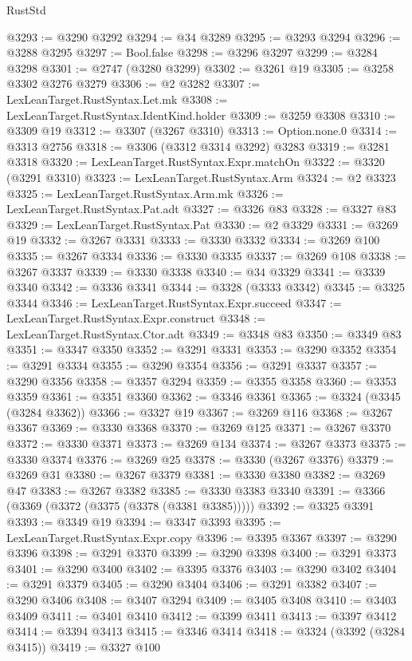 \begin{lexlean}{RustStd}
\begin{coremodule}
@3293 := @3290 @3292
@3294 := @34 @3289
@3295 := @3293 @3294
@3296 := @3288 @3295
@3297 := Bool.false
@3298 := @3296 @3297
@3299 := @3284 @3298
@3301 := @2747 (@3280 @3299)
@3302 := @3261 @19
@3305 := @3258 @3302 @3276 @3279
@3306 := @2 @3282
@3307 := LexLeanTarget.RustSyntax.Let.mk
@3308 := LexLeanTarget.RustSyntax.IdentKind.holder
@3309 := @3259 @3308
@3310 := @3309 @19
@3312 := @3307 (@3267 @3310)
@3313 := Option.none.{0}
@3314 := @3313 @2756
@3318 := @3306 (@3312 @3314 @3292) @3283
@3319 := @3281 @3318
@3320 := LexLeanTarget.RustSyntax.Expr.matchOn
@3322 := @3320 (@3291 @3310)
@3323 := LexLeanTarget.RustSyntax.Arm
@3324 := @2 @3323
@3325 := LexLeanTarget.RustSyntax.Arm.mk
@3326 := LexLeanTarget.RustSyntax.Pat.adt
@3327 := @3326 @83
@3328 := @3327 @83
@3329 := LexLeanTarget.RustSyntax.Pat
@3330 := @2 @3329
@3331 := @3269 @19
@3332 := @3267 @3331
@3333 := @3330 @3332
@3334 := @3269 @100
@3335 := @3267 @3334
@3336 := @3330 @3335
@3337 := @3269 @108
@3338 := @3267 @3337
@3339 := @3330 @3338
@3340 := @34 @3329
@3341 := @3339 @3340
@3342 := @3336 @3341
@3344 := @3328 (@3333 @3342)
@3345 := @3325 @3344
@3346 := LexLeanTarget.RustSyntax.Expr.succeed
@3347 := LexLeanTarget.RustSyntax.Expr.construct
@3348 := LexLeanTarget.RustSyntax.Ctor.adt
@3349 := @3348 @83
@3350 := @3349 @83
@3351 := @3347 @3350
@3352 := @3291 @3331
@3353 := @3290 @3352
@3354 := @3291 @3334
@3355 := @3290 @3354
@3356 := @3291 @3337
@3357 := @3290 @3356
@3358 := @3357 @3294
@3359 := @3355 @3358
@3360 := @3353 @3359
@3361 := @3351 @3360
@3362 := @3346 @3361
@3365 := @3324 (@3345 (@3284 @3362))
@3366 := @3327 @19
@3367 := @3269 @116
@3368 := @3267 @3367
@3369 := @3330 @3368
@3370 := @3269 @125
@3371 := @3267 @3370
@3372 := @3330 @3371
@3373 := @3269 @134
@3374 := @3267 @3373
@3375 := @3330 @3374
@3376 := @3269 @25
@3378 := @3330 (@3267 @3376)
@3379 := @3269 @31
@3380 := @3267 @3379
@3381 := @3330 @3380
@3382 := @3269 @47
@3383 := @3267 @3382
@3385 := @3330 @3383 @3340
@3391 := @3366 (@3369 (@3372 (@3375 (@3378 (@3381 @3385)))))
@3392 := @3325 @3391
@3393 := @3349 @19
@3394 := @3347 @3393
@3395 := LexLeanTarget.RustSyntax.Expr.copy
@3396 := @3395 @3367
@3397 := @3290 @3396
@3398 := @3291 @3370
@3399 := @3290 @3398
@3400 := @3291 @3373
@3401 := @3290 @3400
@3402 := @3395 @3376
@3403 := @3290 @3402
@3404 := @3291 @3379
@3405 := @3290 @3404
@3406 := @3291 @3382
@3407 := @3290 @3406
@3408 := @3407 @3294
@3409 := @3405 @3408
@3410 := @3403 @3409
@3411 := @3401 @3410
@3412 := @3399 @3411
@3413 := @3397 @3412
@3414 := @3394 @3413
@3415 := @3346 @3414
@3418 := @3324 (@3392 (@3284 @3415))
@3419 := @3327 @100

\end{coremodule}
\end{lexlean}
